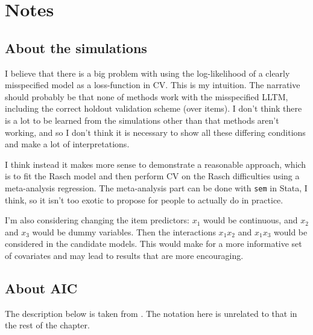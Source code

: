 \section{Notes}

\subsection{About the simulations}

I believe that there is a big problem with using the log-likelihood of a clearly misspecified model as a loss-function in CV. This is my intuition. The narrative should probably be that none of methods work with the misspecified LLTM, including the correct holdout validation scheme (over items). I don't think there is a lot to be learned from the simulations other than that methods aren't working, and so I don't think it is necessary to show all these differing conditions and make a lot of interpretations.

I think instead it makes more sense to demonstrate a reasonable approach, which is to fit the Rasch model and then perform CV on the Rasch difficulties using a meta-analysis regression. The meta-analysis part can be done with \texttt{sem} in Stata, I think, so it isn't too exotic to propose for people to actually do in practice.

I'm also considering changing the item predictors: $x_1$ would be continuous, and $x_2$ and $x_3$ would be dummy variables. Then the interactions $x_1 x_2$ and $x_1 x_3$ would be considered in the candidate models. This would make for a more informative set of covariates and may lead to  results that are more encouraging.


\subsection{About AIC}

The description below is taken from \textcite{burnham2003model}. The notation here is unrelated to that in the rest of the chapter.

